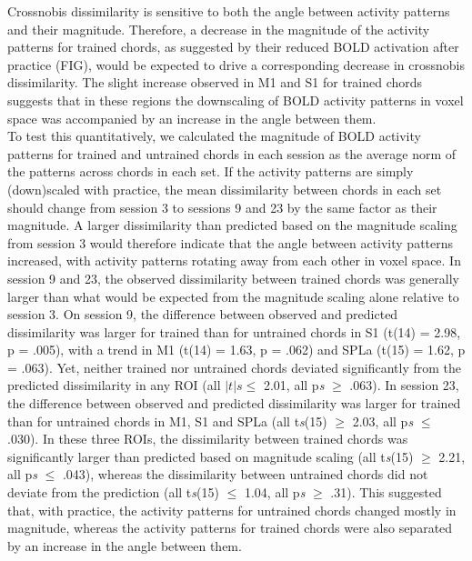 \documentclass{article}
\begin{document}
Crossnobis dissimilarity is sensitive to both the angle between activity patterns and their magnitude. Therefore, a decrease in the magnitude of the activity patterns for trained chords, as suggested by their reduced BOLD activation after practice (FIG), would be expected to drive a corresponding decrease in crossnobis dissimilarity. The slight increase observed in M1 and S1 for trained chords suggests that in these regions the downscaling of BOLD activity patterns in voxel space was accompanied by an increase in the angle between them. \\

To test this quantitatively, we calculated the magnitude of BOLD activity patterns for trained and untrained chords in each session as the average norm of the patterns across chords in each set. If the activity patterns are simply (down)scaled with practice, the mean dissimilarity between chords in each set should change from session 3 to sessions 9 and 23 by the same factor as their magnitude. A larger dissimilarity than predicted based on the magnitude scaling from session 3 would therefore indicate that the angle between activity patterns increased, with activity patterns rotating away from each other in voxel space. In session 9 and 23, the observed dissimilarity between trained chords was generally larger than what would be expected from the magnitude scaling alone relative to session 3. On session 9, the difference between observed and predicted dissimilarity was larger for trained than for untrained chords in S1 (t(14) = 2.98, p = .005), with a trend in M1 (t(14) = 1.63, p = .062) and SPLa (t(15) = 1.62, p = .063). Yet, neither trained nor untrained chords deviated significantly from the predicted dissimilarity in any ROI (all $|t|\textit{s} \leq$ 2.01, all p\textit{s} $\geq$ .063). In session 23, the difference between observed and predicted dissimilarity was larger for trained than for untrained chords in M1, S1 and SPLa (all t\textit{s}(15) $\geq$ 2.03, all p\textit{s} $\leq$ .030). In these three ROIs, the dissimilarity between trained chords was significantly larger than predicted based on magnitude scaling (all t\textit{s}(15) $\geq$ 2.21, all p\textit{s} $\leq$ .043), whereas the dissimilarity between untrained chords did not deviate from the prediction (all t\textit{s}(15) $\leq$ 1.04, all p\textit{s} $\geq$ .31). This suggested that, with practice, the activity patterns for untrained chords changed mostly in magnitude, whereas the activity patterns for trained chords were also separated by an increase in the angle between them. \\
\end{document}
